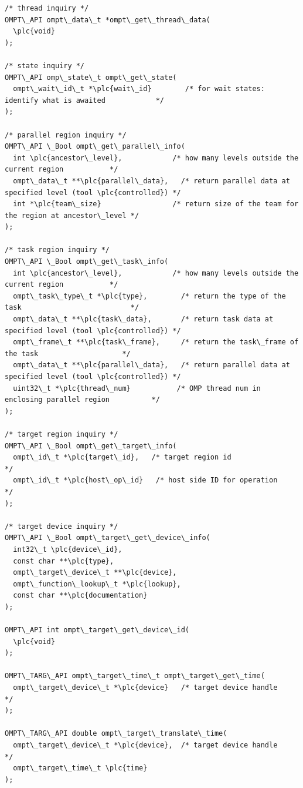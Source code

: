 \documentclass{article}
\begin{document}
\begin{boxedcode}
\begin{verbatim}
/* thread inquiry */
OMPT\_API ompt\_data\_t *ompt\_get\_thread\_data(
  \plc{void}
);

/* state inquiry */
OMPT\_API omp\_state\_t ompt\_get\_state( 
  ompt\_wait\_id\_t *\plc{wait\_id}        /* for wait states: identify what is awaited            */
);

/* parallel region inquiry */
OMPT\_API \_Bool ompt\_get\_parallel\_info(
  int \plc{ancestor\_level},            /* how many levels outside the current region           */
  ompt\_data\_t **\plc{parallel\_data},   /* return parallel data at specified level (tool \plc{controlled}) */
  int *\plc{team\_size}                 /* return size of the team for the region at ancestor\_level */
);

/* task region inquiry */
OMPT\_API \_Bool ompt\_get\_task\_info(
  int \plc{ancestor\_level},            /* how many levels outside the current region           */
  ompt\_task\_type\_t *\plc{type},        /* return the type of the task                          */
  ompt\_data\_t **\plc{task\_data},       /* return task data at specified level (tool \plc{controlled}) */
  ompt\_frame\_t **\plc{task\_frame},     /* return the task\_frame of the task                    */
  ompt\_data\_t **\plc{parallel\_data},   /* return parallel data at specified level (tool \plc{controlled}) */
  uint32\_t *\plc{thread\_num}           /* OMP thread num in enclosing parallel region          */
);

/* target region inquiry */
OMPT\_API \_Bool ompt\_get\_target\_info(
  ompt\_id\_t *\plc{target\_id},   /* target region id                                     */
  ompt\_id\_t *\plc{host\_op\_id}   /* host side ID for operation                           */
);

/* target device inquiry */
OMPT\_API \_Bool ompt\_target\_get\_device\_info(
  int32\_t \plc{device\_id}, 
  const char **\plc{type}, 
  ompt\_target\_device\_t **\plc{device},
  ompt\_function\_lookup\_t *\plc{lookup},
  const char **\plc{documentation}
);

OMPT\_API int ompt\_target\_get\_device\_id(
  \plc{void}
);

OMPT\_TARG\_API ompt\_target\_time\_t ompt\_target\_get\_time( 
  ompt\_target\_device\_t *\plc{device}   /* target device handle                                 */
);

OMPT\_TARG\_API double ompt\_target\_translate\_time(
  ompt\_target\_device\_t *\plc{device},  /* target device handle                                 */
  ompt\_target\_time\_t \plc{time}
);


\end{verbatim}
\end{boxedcode}
\end{document}
